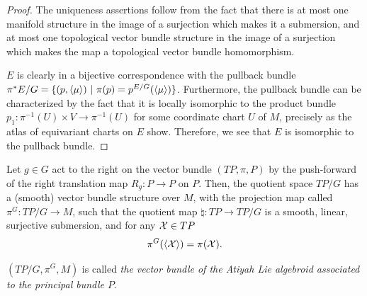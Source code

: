 \begin{proof}
The uniqueness assertions follow from the fact that there is at most one manifold structure in the image of a surjection which makes it a submersion, and at most one topological vector bundle structure in the image of a surjection which makes the map a topological vector bundle homomorphism.

$E$ is clearly in a bijective correspondence with the pullback bundle $\pi^*E/G = \{(p, \left\langle \mu \right\rangle) \ |\  \pi(p) = p^{E/G}(\left\langle \mu \right\rangle)\}$. Furthermore, the pullback bundle can be characterized by the fact that it is locally isomorphic to the product bundle $p_1: \pi^{-1}(U) \times V \to \pi^{-1}(U)$ for some coordinate chart $U$ of $M$, precisely as the atlas of equivariant charts on $E$ show. Therefore, we see that $E$ is isomorphic to the pullback bundle.
\end{proof}

\begin{theorem}\label{theoTPGexists}
Let $g \in G$ act to the right on the vector bundle $(TP, \pi, P)$ by the push-forward of the right translation map $R_g: P \to P$ on $P$. Then, the quotient space $TP/G$ has a (smooth) vector bundle structure over $M$, with the projection map called $\pi^G: TP/G \to M$, such that the quotient map $\natural: TP \to TP/G$ is a smooth, linear, surjective submersion, and for any $\mathcal{X} \in TP$
\begin{align}\label{eqnAnchorAtiyah}
\pi^G(\left\langle \mathcal{X} \right\rangle) = \pi(\mathcal{X}).    
\end{align}
\end{theorem}
$(TP/G, \pi^G, M)$ is called \emph{the vector bundle of the Atiyah Lie algebroid associated to the principal bundle $P$}.

